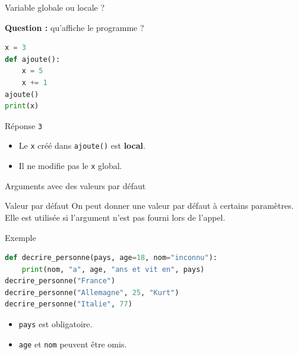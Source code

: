 \documentclass[10pt, xcolor={svgnames}]{beamer}
\begin{document}
\begin{frame}[fragile]{Variable globale ou locale ?}
	
	\textbf{Question :} qu'affiche le programme ?
	
	\vspace{0.3cm}
	
	\begin{exampleblock}{}
		\begin{lstlisting}[language=Python]
x = 3
def ajoute():
	x = 5
	x += 1
ajoute()
print(x)
		\end{lstlisting}
	\end{exampleblock}
	
	\pause
	
	\begin{block}{Réponse}
		\texttt{3}
	\end{block}
	
	\begin{itemize}
		\item Le \texttt{x} créé dans \texttt{ajoute()} est \textbf{local}.
		\item Il ne modifie pas le \texttt{x} global.
	\end{itemize}
	
\end{frame}
\begin{frame}[fragile]{Arguments avec des valeurs par défaut}
	
	\begin{block}{Valeur par défaut}
		On peut donner une valeur par défaut à certains paramètres.
		Elle est utilisée si l'argument n'est pas fourni lors de l'appel.
	\end{block}
	
	\vspace{0.3cm}
	
	\begin{exampleblock}{Exemple}
		\begin{lstlisting}[language=Python]
def decrire_personne(pays, age=18, nom="inconnu"):
	print(nom, "a", age, "ans et vit en", pays)
decrire_personne("France")
decrire_personne("Allemagne", 25, "Kurt")
decrire_personne("Italie", 77)
		\end{lstlisting}
	\end{exampleblock}
	
	\vspace{0.2cm}
	
	\begin{itemize}
		\item \texttt{pays} est obligatoire.
		\item \texttt{age} et \texttt{nom} peuvent être omis.
	\end{itemize}
	
\end{frame}
\end{document}
